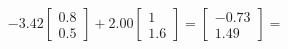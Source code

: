 \documentclass[preview]{standalone}
\begin{document}
\begin{align*}
-3.42 \begin{bmatrix} 0.8 \\ 0.5 \end{bmatrix} + 2.00 \begin{bmatrix} 1 \\ 1.6 \end{bmatrix} = \begin{bmatrix} -0.73 \\ 1.49 \end{bmatrix} =
\end{align*}
\end{document}
